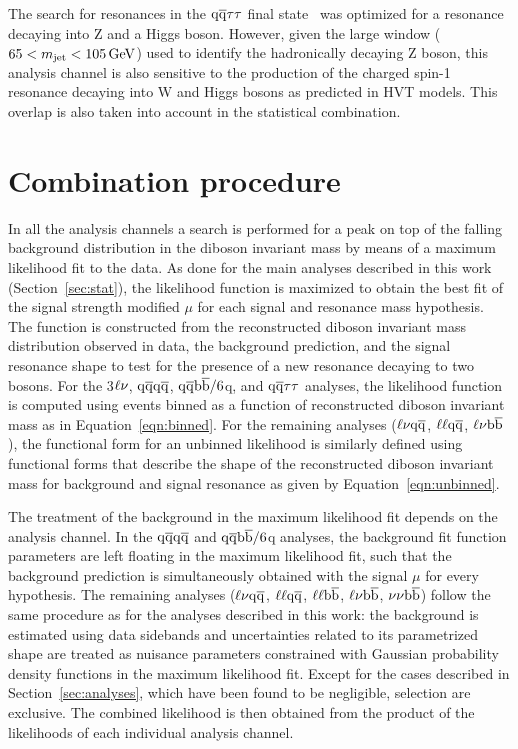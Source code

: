 The search for resonances in the $\mathrm{q}\overline{\mathrm{q}} \tau\tau$ final state~\cite{Khachatryan:2015bma} was optimized for a resonance \Zpr decaying into Z and a Higgs boson.
However, given the large \mJ window ($65 <  m_{\text{jet}} < 105\,\text{Ge\hspace{-.08em}V}$) used to identify the hadronically decaying Z boson, this analysis channel is also sensitive to the production of the charged spin-1 \Wpr resonance decaying into W and Higgs bosons as predicted in HVT models. This overlap is also taken into account in the statistical combination.

\section{Combination procedure}\label{sec:combination}

In all the analysis channels a search is performed for a peak on top of the falling background distribution in the diboson invariant mass by means of a maximum likelihood fit to the data.
As done for the main analyses described in this work (Section~\ref{sec:stat}), the likelihood function is maximized to obtain the best fit of the signal strength modified $\mu$ for each signal and resonance mass hypothesis.
The function is constructed from the reconstructed diboson invariant mass distribution observed in data, the background prediction, and the signal resonance shape to test for the presence of a new resonance decaying to two bosons.
For the 3$\ell\nu$, $\mathrm{q}\overline{\mathrm{q}} \mathrm{q}\overline{\mathrm{q}}$, $\mathrm{q}\overline{\mathrm{q}}{\mathrm{b}\overline{\mathrm{b}}}/6$q, and $\mathrm{q}\overline{\mathrm{q}} \tau\tau $ analyses, the likelihood function is computed using events binned as a function of reconstructed diboson invariant mass as in Equation~\ref{eqn:binned}.
For the remaining analyses ($\ell \nu \mathrm{q}\overline{\mathrm{q}}$,  $\ell\ell \mathrm{q}\overline{\mathrm{q}}$, $\ell \nu {\mathrm{b}\overline{\mathrm{b}}}$), the functional form for an unbinned likelihood is similarly defined using functional forms that describe the shape of the reconstructed diboson invariant mass for background and signal resonance as given by Equation~\ref{eqn:unbinned}.

The treatment of the background in the maximum likelihood fit depends on the analysis channel.
In the $\mathrm{q}\overline{\mathrm{q}} \mathrm{q}\overline{\mathrm{q}}$ and $\mathrm{q}\overline{\mathrm{q}}{\mathrm{b}\overline{\mathrm{b}}}/6$q analyses, the background fit function parameters are left floating in the maximum likelihood fit, such that the background prediction is simultaneously obtained with the signal $\mu$ for every hypothesis.
The remaining analyses ($\ell \nu \mathrm{q}\overline{\mathrm{q}}$,  $\ell\ell \mathrm{q}\overline{\mathrm{q}}$, $\ell \ell {\mathrm{b}\overline{\mathrm{b}}}$, $\ell \nu {\mathrm{b}\overline{\mathrm{b}}}$, $\nu \nu {\mathrm{b}\overline{\mathrm{b}}}$) follow the same procedure as for the analyses described in this work: the background is estimated using data sidebands and uncertainties related to its parametrized shape are treated as nuisance parameters constrained with Gaussian probability density functions in the maximum likelihood fit. Except for the cases described in Section~\ref{sec:analyses}, which have been found to be negligible, selection are exclusive. The combined likelihood is then obtained from the product of the likelihoods of each individual analysis channel.

